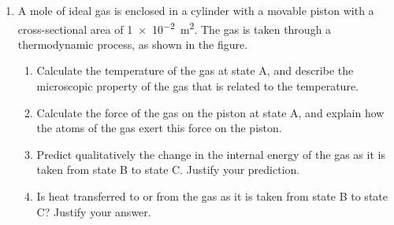 \documentclass{../../oss-apphys}
\begin{document}
\begin{enumerate}[leftmargin=15pt]
\begin{enumerate}[leftmargin=18pt]
  \item A cube of lead with a side dimension of \SI{5.0}{cm} is slowly lowered
    into the beaker of oil by a thin string attached to a spring scale at a
    constant rate, as shown in the figure. The density of lead is
    \SI{11300}{kg/m^3}.
    \begin{center}
    \end{center}
    \begin{enumerate}
    \item What will be the spring scale reading in newtons when the lead has
      been submerged to location 2?
    \item Does the spring scale reading increase, decrease, or stay the
      same when the cube is lowered from location 2 to location 3?
      Justify your answer by referencing the pressure of the fluid on
      the lead cube.
    \item The lead cube is lowered from above the oil’s surface (location
      1) to a spot just below the surface (location 2) until the cube is
      just above the bottom of the beaker (location 3). Describe any
      changes in pressure on the bottom of the beaker during this
      process. Explain your answer.
    \end{enumerate}
  \end{enumerate}

  \newpage
  
\item A mole of ideal gas is enclosed in a cylinder with a movable piston
  with a cross-sectional area of \SI{1e-2}{m^2}. The gas is taken through a
  thermodynamic process, as shown in the figure.
  \begin{center}
  \end{center}
  \begin{enumerate}[leftmargin=18pt]
  \item Calculate the temperature of the gas at state A, and describe the
    microscopic property of the gas that is related to the
    temperature.
    \vspace{1in}
  \item Calculate the force of the gas on the piston at state A, and
    explain how the atoms of the gas exert this force on the piston.
    \vspace{1in}
  \item Predict qualitatively the change in the internal energy of the gas
    as it is taken from state B to state C. Justify your prediction.
    \vspace{1in}
  \item Is heat transferred to or from the gas as it is taken from state B to
    state C? Justify your answer.
    \newpage


\end{enumerate}
\end{enumerate}
\end{document}
